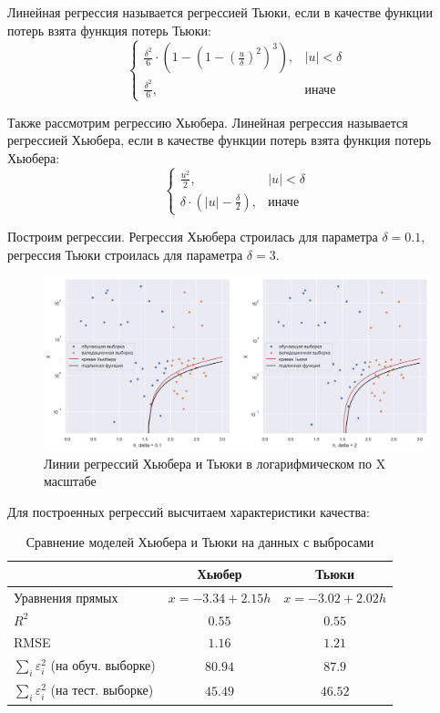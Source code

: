 \documentclass[a4paper,12pt]{article}
\begin{document}
Линейная регрессия называется регрессией Тьюки, если в качестве функции потерь взята функция потерь Тьюки:
$$
\begin{cases}
    \frac{\delta^2}{6} \cdot \left(1 - \left(1 - \left(\frac{u}{\delta} \right)^2\right)^3\right), & |u| < \delta\\
    \frac{\delta^2}{6}, & \text{иначе}
\end{cases}
$$

Также рассмотрим регрессию Хьюбера. Линейная регрессия называется регрессией Хьюбера, если в качестве функции потерь взята функция потерь Хьюбера:
$$
\begin{cases}
    \frac{u^2}{2}, & |u| < \delta\\
    \delta \cdot \left( |u| - \frac{\delta}{2} \right), & \text{иначе}
\end{cases}
$$

Построим регрессии. Регрессия Хьюбера строилась для параметра $\delta = 0.1$, регрессия Тьюки строилась для параметра $\delta = 3$.

\begin{figure}[H]
    \centering
    \includegraphics[width=\linewidth]{src/img/линии_Тьюки_и_Хьюбера.png}
    \caption{Линии регрессий Хьюбера и Тьюки в логарифмическом по X масштабе}
\end{figure}

Для построенных регрессий высчитаем характеристики качества:

\begin{table}[H]
    \begin{center}
        \begin{tabular}{|l|c|c|}
            \hline
            & Хьюбер & Тьюки \\ \hline
            Уравнения прямых & $x = -3.34 + 2.15 h$ & $x = -3.02 + 2.02 h$ \\ \hline
            $R^2$ & $0.55$ & $0.55$ \\ \hline
            RMSE & $1.16$ & $1.21$ \\ \hline
            $\sum\limits_i \varepsilon_i^2$ (на обуч. выборке) & $80.94$ & $87.9$ \\ \hline
            $\sum\limits_i \varepsilon_i^2$ (на тест. выборке) & $45.49$ & $46.52$ \\ \hline
        \end{tabular}
        \caption{Сравнение моделей Хьюбера и Тьюки на данных с выбросами}
    \end{center}
\end{table}
\end{document}
